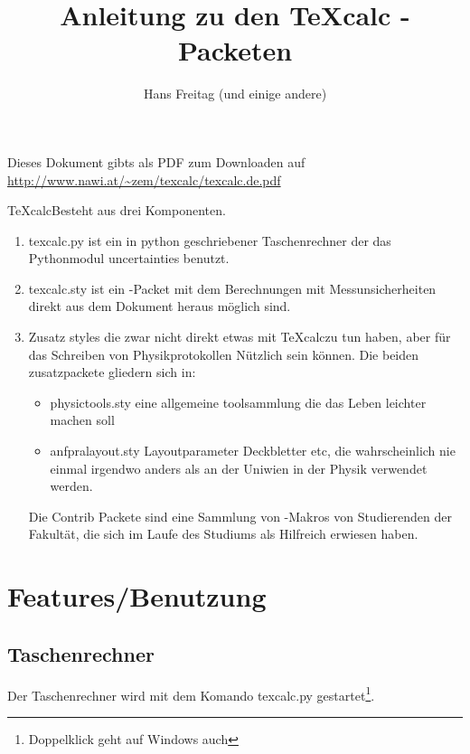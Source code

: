\documentclass[a4paper]{article}
\newcommand{\texcalc}{{\TeX}calc}
\begin{document}
\title{Anleitung zu den {\TeX}calc \LaTeXe-Packeten}
\author{Hans Freitag (und einige andere)}
\maketitle

Dieses Dokument gibts als PDF zum Downloaden auf \url{http://www.nawi.at/~zem/texcalc/texcalc.de.pdf}


\texcalc Besteht aus drei Komponenten.

\begin{enumerate}
\item texcalc.py ist ein in python geschriebener Taschenrechner der das Pythonmodul
		uncertainties benutzt.
\item texcalc.sty ist ein \LaTeXe-Packet mit dem Berechnungen mit Messunsicherheiten
		direkt aus dem \LaTeXe Dokument heraus möglich sind.
\item Zusatz styles die zwar nicht direkt etwas mit \texcalc zu tun haben, aber für
		das Schreiben von Physikprotokollen Nützlich sein können. Die beiden zusatzpackete
		gliedern sich in:
	\begin{itemize}
	\item physictools.sty eine allgemeine toolsammlung die das Leben leichter machen soll
	\item anfpralayout.sty Layoutparameter Deckbletter etc, die wahrscheinlich nie einmal
		irgendwo anders als an der Uniwien in der Physik verwendet werden.
	\end{itemize}
	Die Contrib Packete sind eine Sammlung von \LaTeXe-Makros von Studierenden der Fakultät,
	die sich im Laufe des Studiums als Hilfreich erwiesen haben.
\end{enumerate}

\tableofcontents

\section{Features/Benutzung}

\subsection{Taschenrechner}

Der Taschenrechner wird mit dem Komando texcalc.py gestartet\footnote{Doppelklick geht auf Windows auch}.
\end{document}
